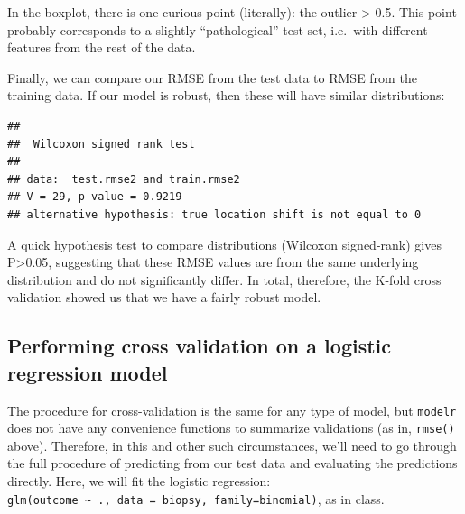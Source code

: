 \documentclass[]{article}
\newenvironment{Shaded}{\begin{snugshade}}{\end{snugshade}}
\newcommand{\KeywordTok}[1]{\textcolor[rgb]{0.13,0.29,0.53}{\textbf{#1}}}
\newcommand{\DataTypeTok}[1]{\textcolor[rgb]{0.13,0.29,0.53}{#1}}
\newcommand{\StringTok}[1]{\textcolor[rgb]{0.31,0.60,0.02}{#1}}
\newcommand{\OperatorTok}[1]{\textcolor[rgb]{0.81,0.36,0.00}{\textbf{#1}}}
\newcommand{\NormalTok}[1]{#1}
\begin{document}
In the boxplot, there is one curious point (literally): the outlier
\textgreater{} 0.5. This point probably corresponds to a slightly
``pathological'' test set, i.e.~with different features from the rest of
the data.

Finally, we can compare our RMSE from the test data to RMSE from the
training data. If our model is robust, then these will have similar
distributions:

\begin{Shaded}
\end{Shaded}

\begin{verbatim}
## 
##  Wilcoxon signed rank test
## 
## data:  test.rmse2 and train.rmse2
## V = 29, p-value = 0.9219
## alternative hypothesis: true location shift is not equal to 0
\end{verbatim}

A quick hypothesis test to compare distributions (Wilcoxon signed-rank)
gives P\textgreater{}0.05, suggesting that these RMSE values are from
the same underlying distribution and do not significantly differ. In
total, therefore, the K-fold cross validation showed us that we have a
fairly robust model.

\subsection{Performing cross validation on a logistic regression
model}\label{performing-cross-validation-on-a-logistic-regression-model}

The procedure for cross-validation is the same for any type of model,
but \texttt{modelr} does not have any convenience functions to summarize
validations (as in, \texttt{rmse()} above). Therefore, in this and other
such circumstances, we'll need to go through the full procedure of
predicting from our test data and evaluating the predictions directly.
Here, we will fit the logistic regression:
\texttt{glm(outcome\ \textasciitilde{}\ .,\ data\ =\ biopsy,\ family=binomial)},
as in class.
\end{document}
